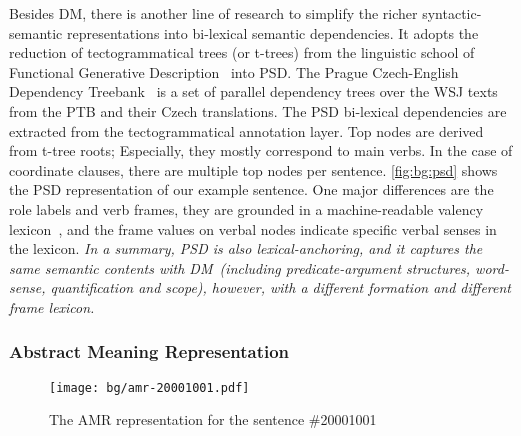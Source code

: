  Besides DM, there is another
line of research to simplify the richer syntactic-semantic
representations into bi-lexical semantic dependencies. It adopts the
reduction of tectogrammatical trees (or t-trees) from the linguistic
school of Functional Generative
Description~\citep[FGD,][]{Sga:Haj:Pan:86,hajic2012announcing} into
PSD. The Prague Czech-English Dependency
Treebank~\citep[PCEDT,][]{hajic2012announcing} is a set of parallel
dependency trees over the WSJ texts from the PTB and their Czech
translations. The PSD bi-lexical dependencies are extracted from the
tectogrammatical annotation layer. Top nodes are derived from t-tree
roots; Especially, they mostly correspond to main verbs. In the case of
coordinate clauses, there are multiple top nodes per
sentence. \autoref{fig:bg:psd} shows the PSD representation of our
example sentence. One major differences are the role labels and verb
frames, they are grounded in a machine-readable valency
lexicon~\citep{urevsova2016czengvallex}, and the frame values on
verbal nodes indicate specific verbal senses in the lexicon. \textit{In a
summary, PSD is also lexical-anchoring, and it captures the same
semantic contents with DM~(including predicate-argument structures,
word-sense, quantification and scope), however, with a different
formation and different frame lexicon.}



\subsubsection{Abstract Meaning Representation}
\label{ssec:bg:amr}
%
\begin{figure}[!th]
\centering
\texttt{[image: bg/amr-20001001.pdf]}
\caption{\label{fig:bg:amr} The AMR representation for the sentence
  \#20001001}
\end{figure}

